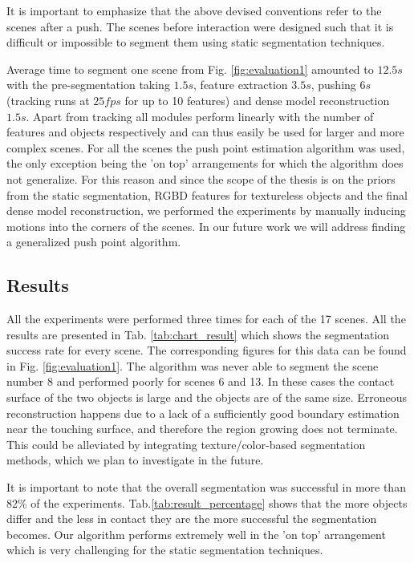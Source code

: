 It is  important to  emphasize that the above  devised conventions 
refer to  the scenes after a  push. The scenes  before interaction were
designed such that it is difficult or impossible to segment
them using static segmentation techniques.
 
Average time to segment one scene from Fig. \ref{fig:evaluation1} amounted to $12.5s$ 
with the pre-segmentation taking $1.5s$, feature extraction $3.5s$, pushing 
$6s$ (tracking runs at $25fps$ for up to 10 features) and dense model reconstruction $1.5s$.
Apart from tracking all modules perform linearly with the
number of  features and objects  respectively and can thus  easily be
used for larger and more complex  scenes. For all the scenes the push
point estimation algorithm was used, the only exception being the 'on
top'  arrangements for which the algorithm does not generalize. 
For this reason and since the scope of the thesis is on the priors from
the static segmentation, RGBD features for
textureless objects and the final dense model reconstruction, we performed
the experiments by manually inducing motions into the corners of the scenes.
In  our  future work we  will address  finding a generalized  push point algorithm.
\vspace{-0.5ex}
\subsection{Results}
All  the  experiments were  performed  three  times  for each  of  the
17    scenes.    All    the    results   are    presented    in Tab.
\ref{tab:chart_result} which  shows the segmentation success rate  for every scene. 
The  corresponding figures for this data  can be found in  Fig. \ref{fig:evaluation1}. 
The algorithm was never able to segment the scene number 8 and performed poorly for scenes
6 and 13. In these cases the contact surface of the two objects is large and the objects are of the same size.
Erroneous reconstruction happens due to a lack of a sufficiently good boundary estimation
near the touching surface, and therefore the region growing does not terminate.
This could be alleviated by integrating texture/color-based segmentation methods,
which we plan to investigate in the future.

It  is  important to  note  that  the  overall
segmentation   was    successful   in   more   than    82\%   of   the
experiments.  Tab.\ref{tab:result_percentage}  shows that the more
objects differ  and the less in  contact they are  the more successful
the  segmentation becomes.  Our
algorithm  performs extremely well in the  'on top'  arrangement which  is very
challenging for the static segmentation techniques.

